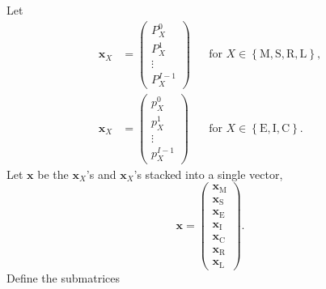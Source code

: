\documentclass[12pt]{article}
\renewcommand{\vec}[1]{\mathbf{#1}}
\begin{document}
Let
\begin{subequations}
  \begin{align}
    \vec{x}_X &=
      \begin{pmatrix}
        P_X^0\\
        P_X^1\\
        \vdots\\
        P_X^{I - 1}
      \end{pmatrix}
    &&
    \text{for $X \in
       \left\{\mathrm{M}, \mathrm{S}, \mathrm{R}, \mathrm{L}\right\}$},
    \\
    \vec{x}_X &=
      \begin{pmatrix}
        p_X^0\\
        p_X^1\\
        \vdots\\
        p_X^{I - 1}
      \end{pmatrix}
    &&
    \text{for $X \in
       \left\{\mathrm{E}, \mathrm{I}, \mathrm{C}\right\}$}.
  \end{align}
\end{subequations}
Let $\vec{x}$ be the $\vec{x}_X$'s and $\vec{x}_X$'s stacked into a
single vector,
\begin{equation}
  \vec{x} =
  \begin{pmatrix}
    \vec{x}_{\mathrm{M}}\\
    \vec{x}_{\mathrm{S}}\\
    \vec{x}_{\mathrm{E}}\\
    \vec{x}_{\mathrm{I}}\\
    \vec{x}_{\mathrm{C}}\\
    \vec{x}_{\mathrm{R}}\\
    \vec{x}_{\mathrm{L}}
  \end{pmatrix}.
\end{equation}
Define the submatrices
\end{document}
